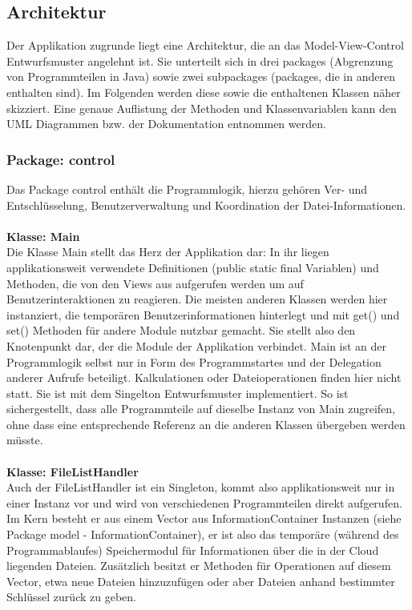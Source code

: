\documentclass[13pt,a4paper,bibliography=totocnumbered,listof=totocnumbered]{scrartcl}
\begin{document}
\subsection{Architektur}
Der Applikation zugrunde liegt eine Architektur, die an das Model-View-Control Entwurfsmuster angelehnt ist. Sie unterteilt sich in drei packages (Abgrenzung von Programmteilen in Java) sowie zwei subpackages (packages, die in anderen enthalten sind). Im Folgenden werden diese sowie die enthaltenen Klassen näher skizziert. Eine genaue Auflistung der Methoden und Klassenvariablen kann den UML Diagrammen bzw. der Dokumentation entnommen werden.

\subsubsection{Package: control}
Das Package control enthält die Programmlogik, hierzu gehören Ver- und Entschlüsselung, Benutzerverwaltung und Koordination der Datei-Informationen.\\\\
\textbf{Klasse: Main}\\
Die Klasse Main stellt das Herz der Applikation dar: In ihr liegen applikationsweit verwendete Definitionen (public static final Variablen) und Methoden, die von den Views aus aufgerufen werden um auf Benutzerinteraktionen zu reagieren. Die meisten anderen Klassen werden hier instanziert, die temporären Benutzerinformationen hinterlegt und mit get() und set() Methoden für andere Module nutzbar gemacht. Sie stellt also den Knotenpunkt dar, der die Module der Applikation verbindet. Main ist an der Programmlogik selbst nur in Form des Programmstartes und der Delegation anderer Aufrufe beteiligt. Kalkulationen oder Dateioperationen finden hier nicht statt. Sie ist mit dem Singelton Entwurfsmuster implementiert. So ist sichergestellt, dass alle Programmteile auf dieselbe Instanz von Main zugreifen, ohne dass eine entsprechende Referenz an die anderen Klassen übergeben werden müsste.\\\\
\textbf{Klasse: FileListHandler}\\
Auch der FileListHandler ist ein Singleton, kommt also applikationsweit nur in einer Instanz vor und wird von verschiedenen Programmteilen direkt aufgerufen. Im Kern besteht er aus einem Vector aus InformationContainer Instanzen (siehe Package model - InformationContainer), er ist also das temporäre (während des Programmablaufes) Speichermodul für Informationen über die in der Cloud liegenden Dateien. Zusätzlich besitzt er Methoden für Operationen auf diesem Vector, etwa neue Dateien hinzuzufügen oder aber Dateien anhand bestimmter Schlüssel zurück zu geben.\\\\
\end{document}
